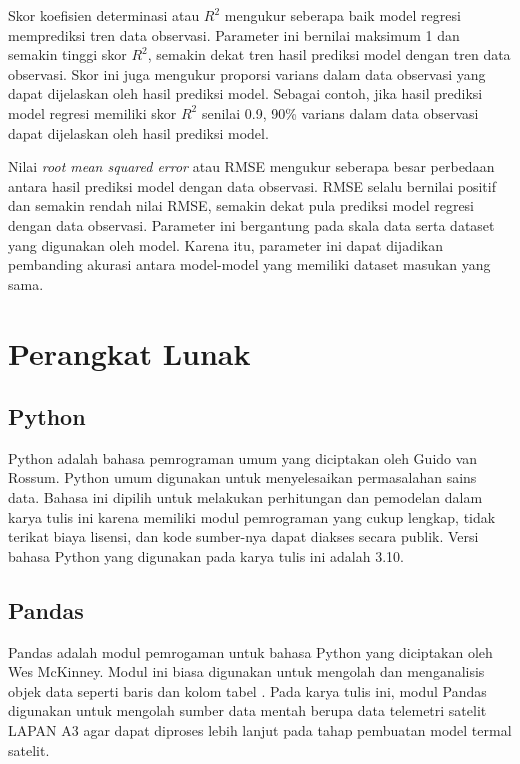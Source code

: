 Skor koefisien determinasi atau $R^2$ mengukur seberapa baik model regresi
memprediksi tren data observasi. Parameter ini bernilai maksimum 1 dan semakin
tinggi skor $R^2$, semakin dekat tren hasil prediksi model dengan tren data
observasi. Skor ini juga mengukur proporsi varians dalam data observasi yang
dapat dijelaskan oleh hasil prediksi model. Sebagai contoh, jika hasil prediksi
model regresi memiliki skor $R^2$ senilai 0.9, 90\% varians dalam data
observasi dapat dijelaskan oleh hasil prediksi model.

Nilai \textit{root mean squared error} atau RMSE mengukur seberapa besar
perbedaan antara hasil prediksi model dengan data observasi. RMSE selalu
bernilai positif dan semakin rendah nilai RMSE, semakin dekat pula prediksi
model regresi dengan data observasi. Parameter ini bergantung pada skala data
serta dataset yang digunakan oleh model. Karena itu, parameter ini dapat
dijadikan pembanding akurasi antara model-model yang memiliki dataset masukan
yang sama.

\section{Perangkat Lunak}

\subsection{Python}

Python adalah bahasa pemrograman umum yang diciptakan oleh Guido van
Rossum. Python umum digunakan untuk menyelesaikan permasalahan sains
data. Bahasa ini dipilih untuk melakukan perhitungan dan
pemodelan dalam karya tulis ini karena memiliki modul pemrograman yang
cukup lengkap, tidak terikat biaya lisensi, dan kode sumber-nya dapat
diakses secara publik. Versi bahasa Python yang digunakan pada karya
tulis ini adalah 3.10.

\subsection{Pandas}

Pandas adalah modul pemrogaman untuk bahasa Python yang diciptakan oleh Wes
McKinney. Modul ini biasa digunakan untuk mengolah dan menganalisis objek data
seperti baris dan kolom tabel \cite{reback2022}. Pada karya tulis ini, modul Pandas
digunakan untuk mengolah sumber data mentah berupa data telemetri satelit LAPAN
A3 agar dapat diproses lebih lanjut pada tahap pembuatan model termal satelit.

